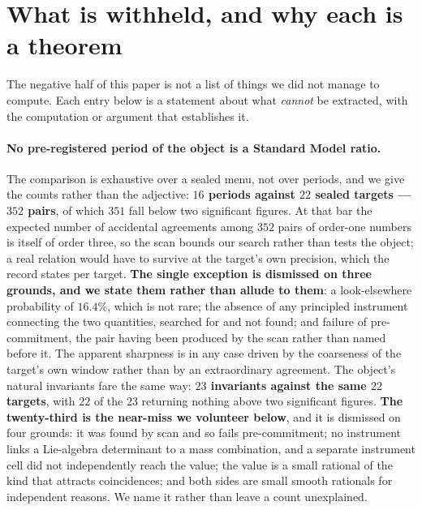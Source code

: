 \documentclass[11pt,a4paper]{article}
\theoremstyle{definition}
\theoremstyle{remark}
\begin{document}
\section{What is withheld, and why each is a theorem}\label{sec:withheld}

The negative half of this paper is not a list of things we did not manage to compute. Each entry
below is a statement about what \emph{cannot} be extracted, with the computation or argument that
establishes it.

\paragraph{No pre-registered period of the object is a Standard Model ratio.} The comparison is exhaustive over a sealed
menu, not over periods, and we give the counts rather than the adjective: \textbf{$16$ periods against $22$ sealed targets ---
$352$ pairs}, of which $351$ fall below two significant figures. At that bar the expected number of accidental agreements among $352$ pairs of order-one numbers is itself of order three, so the scan bounds our search rather than tests the object; a real relation would have to survive at the target's own precision, which the record states per target. \textbf{The single exception is dismissed on
three grounds, and we state them rather than allude to them}: a look-elsewhere probability of
$16.4\%$, which is not rare; the absence of any principled instrument connecting the two quantities,
searched for and not found; and failure of pre-commitment, the pair having been produced by the scan
rather than named before it. The apparent sharpness is in any case driven by the coarseness of the
target's own window rather than by an extraordinary agreement. The object's natural invariants fare the same way:
\textbf{$23$ invariants against the same $22$ targets}, with $22$ of the $23$ returning nothing above two significant figures. \textbf{The
twenty-third is the near-miss we volunteer below}, and it is dismissed on four grounds: it was found
by scan and so fails pre-commitment; no instrument links a Lie-algebra determinant to a mass
combination, and a separate instrument cell did not independently reach the value; the value is a
small rational of the kind that attracts coincidences; and both sides are small smooth rationals for
independent reasons. We name it rather than leave a count unexplained.
\end{document}
